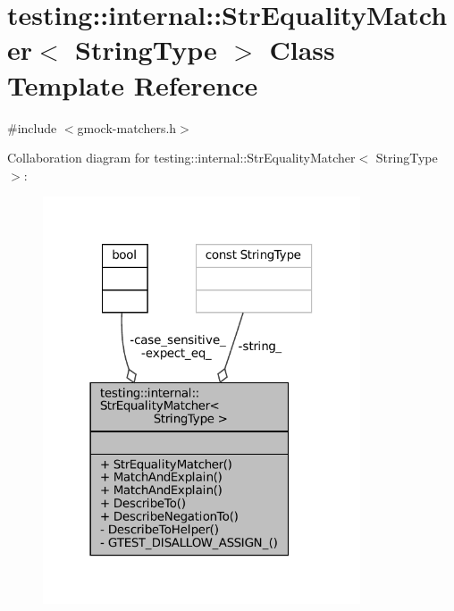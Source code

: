 \hypertarget{classtesting_1_1internal_1_1StrEqualityMatcher}{}\section{testing\+:\+:internal\+:\+:Str\+Equality\+Matcher$<$ String\+Type $>$ Class Template Reference}
\label{classtesting_1_1internal_1_1StrEqualityMatcher}


{\ttfamily \#include $<$gmock-\/matchers.\+h$>$}



Collaboration diagram for testing\+:\+:internal\+:\+:Str\+Equality\+Matcher$<$ String\+Type $>$\+:
\nopagebreak
\begin{figure}[H]
\begin{center}
\leavevmode
\includegraphics[width=266pt]{classtesting_1_1internal_1_1StrEqualityMatcher__coll__graph}
\end{center}
\end{figure}
